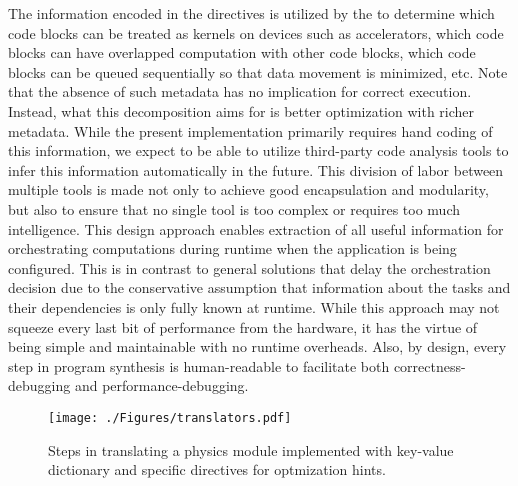 The information encoded in the directives is utilized by the \CT to
determine which code blocks can be treated as kernels on devices  such
as accelerators, which code blocks can have overlapped computation
with other code blocks, which code blocks can be queued sequentially
so that data movement is minimized, etc. Note that the absence of such
metadata has no implication for correct execution. Instead, what this
decomposition aims for is better optimization with richer
metadata. While the present implementation primarily requires hand
coding of this information, we expect to be able to utilize
third-party code analysis tools to infer this information
automatically in the future. This division of labor between multiple
tools is made not only to achieve good encapsulation and modularity,
but also to ensure that no single tool is too complex or requires too
much intelligence. This design approach enables extraction of all
useful information for orchestrating computations during runtime when
the application is being configured. This is in contrast to general
solutions that delay the orchestration decision due to the
conservative assumption that information about the tasks and their
dependencies is only fully known at runtime. While this approach may
not squeeze every last bit of performance from the hardware, it has
the virtue of being simple and maintainable with no runtime
overheads. Also, by design, every step in program synthesis is
human-readable to facilitate both correctness-debugging and
performance-debugging.

\begin{figure*}[]
  \centering
  \texttt{[image: ./Figures/translators.pdf]}
  \vspace{-0.5in}
   \caption{Steps in translating a physics module implemented with
     key-value dictionary and \flashx specific directives for
     optmization hints.}
  \label{fig:translators}
\end{figure*}


